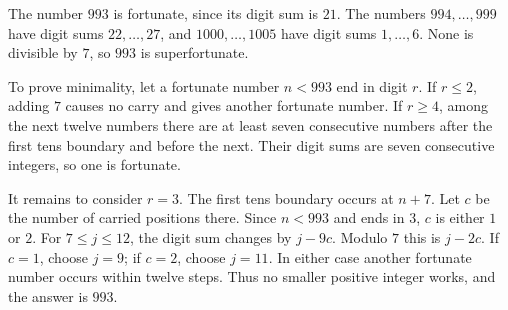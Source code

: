 The number $993$ is fortunate, since its digit sum is $21$. The numbers $994,\ldots,999$ have digit sums $22,\ldots,27$, and $1000,\ldots,1005$ have digit sums $1,\ldots,6$. None is divisible by $7$, so $993$ is superfortunate.

To prove minimality, let a fortunate number $n<993$ end in digit $r$. If $r\le2$, adding $7$ causes no carry and gives another fortunate number. If $r\ge4$, among the next twelve numbers there are at least seven consecutive numbers after the first tens boundary and before the next. Their digit sums are seven consecutive integers, so one is fortunate.

It remains to consider $r=3$. The first tens boundary occurs at $n+7$. Let $c$ be the number of carried positions there. Since $n<993$ and ends in $3$, $c$ is either $1$ or $2$. For $7\le j\le12$, the digit sum changes by $j-9c$. Modulo $7$ this is $j-2c$. If $c=1$, choose $j=9$; if $c=2$, choose $j=11$. In either case another fortunate number occurs within twelve steps. Thus no smaller positive integer works, and the answer is $\boxed{993}$.
